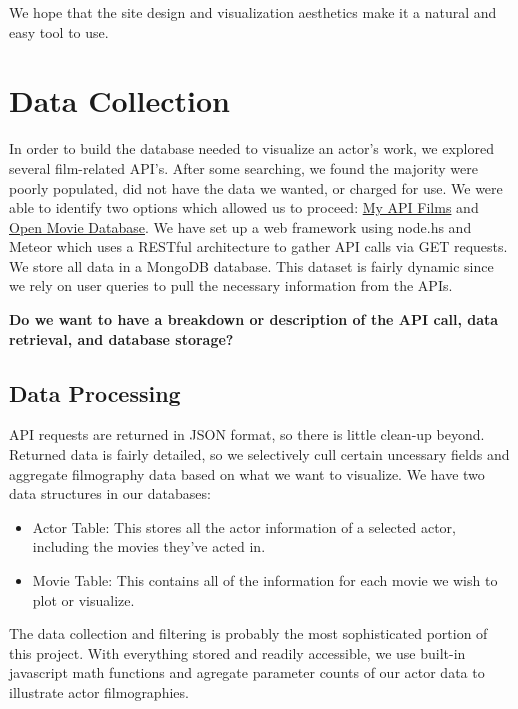 \documentclass[12pt]{article}
\begin{document}
We hope that the site design and visualization aesthetics make it a natural and easy tool to use.
\newpage 

\section{Data Collection}
	In order to build the database needed to visualize an actor's work, we explored several film-related API's.  After some searching, we found the majority were poorly populated, did not have the data we wanted, or charged for use.  We were able to identify two options which allowed us to proceed: \href{http://api.myapifilms.com/index.do}{My API Films} and \href{http://www.omdbapi.com/}{Open Movie Database}. We have set up a web framework using node.hs and Meteor which uses a RESTful architecture to gather API calls via GET requests. We store all data in a MongoDB database. This dataset is fairly dynamic since we rely on user queries to pull the necessary information from the APIs.

	
	\begin{center}
	\color{blue}
	\textbf{Do we want to have a breakdown or description of the API call, data retrieval, and database storage? }
	\end{center}
	
\subsection{Data Processing}
	API requests are returned in JSON format, so there is little clean-up beyond. Returned data is fairly detailed, so we selectively cull certain uncessary fields and aggregate filmography data based on what we want to visualize. We have two data structures in our databases:
	
	\begin{itemize}
		\item Actor Table: This stores all the actor information of a selected actor, including the movies they've acted in.
		\item Movie Table: This contains all of the information for each movie we wish to plot or visualize.
	\end{itemize}

	The data collection and filtering is probably the most sophisticated portion of this project. With everything stored and readily accessible, we use built-in javascript math functions and agregate parameter counts of our actor data to illustrate actor filmographies.
\end{document}
